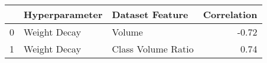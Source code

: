 \begin{tabular}{lllr}
\toprule
 & Hyperparameter & Dataset Feature & Correlation \\
\midrule
0 & Weight Decay & Volume & -0.72 \\
1 & Weight Decay & Class Volume Ratio & 0.74 \\
\bottomrule
\end{tabular}
